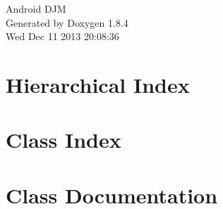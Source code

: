\documentclass[twoside]{book}
\newcommand{\clearemptydoublepage}{%
  \newpage{\pagestyle{empty}\cleardoublepage}%
}
\begin{document}
\begin{titlepage}
\vspace*{7cm}
\begin{center}%
{\Large Android D\-J\-M }\\
\vspace*{1cm}
{\large Generated by Doxygen 1.8.4}\\
\vspace*{0.5cm}
{\small Wed Dec 11 2013 20:08:36}\\
\end{center}
\end{titlepage}
\clearemptydoublepage
\tableofcontents
\clearemptydoublepage
{}

\chapter{Hierarchical Index}

\chapter{Class Index}

\chapter{Class Documentation}















\newpage
{}
{}
\printindex
\end{document}
